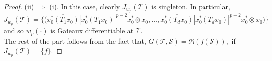 \documentclass[10pt,a4paper]{amsart}
\begin{document}
\begin{proof}
  (ii) $\Rightarrow$ (i).  In this case, clearly $J_{w_p}(\mathcal{T})$ is singleton. In particular,
  $$J_{w_p}(\mathcal{T})=\bigg\{\bigg(\overline{x_0^*(T_1x_0)}|x_0^*(T_1x_0)|^{p-2}x_0^*\otimes x_0,\ldots,\overline{x_0^*(T_dx_0)}|x_0^*(T_dx_0)|^{p-2}x_0^*\otimes x_0\bigg)\bigg\}$$
   and so $w_p(\cdot)$ is Gateaux differentiable at $\mathcal{T}.$\\
   
   The rest of the part follows from the fact that, $	G(\mathcal{T},\mathcal{S})=\Re(f(\mathcal{S})),$ if $J_{w_p}(\mathcal{T})=\{f\}.$ 
\end{proof}
\end{document}
